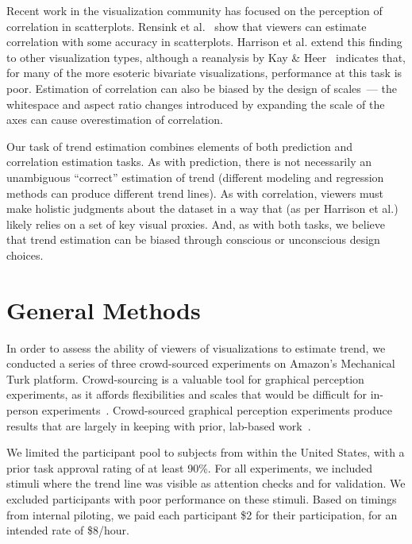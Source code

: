 \documentclass[chi_draft]{sigchi}
\begin{document}
Recent work in the visualization community has focused on the perception of correlation in scatterplots. Rensink et al.~\cite{rensink2010perception} show that viewers can estimate correlation with some accuracy in scatterplots. Harrison et al. \cite{harrison2014ranking} extend this finding to other visualization types, although a reanalysis by Kay \& Heer~\cite{kay2016beyond} indicates that, for many of the more esoteric bivariate visualizations, performance at this task is poor. Estimation of correlation can also be biased by the design of scales~\cite{cleveland1982variables}--- the whitespace and aspect ratio changes introduced by expanding the scale of the axes can cause overestimation of correlation.

Our task of trend estimation combines elements of both prediction and correlation estimation tasks. As with prediction, there is not necessarily an unambiguous ``correct'' estimation of trend (different modeling and regression methods can produce different trend lines). As with correlation, viewers must make holistic judgments about the dataset in a way that (as per Harrison et al.) likely relies on a set of key visual proxies. And, as with both tasks, we believe that trend estimation can be biased through conscious or unconscious design choices.  

\section{General Methods}

In order to assess the ability of viewers of visualizations to estimate trend, we conducted a series of three crowd-sourced experiments on Amazon's Mechanical Turk platform. Crowd-sourcing is a valuable tool for graphical perception experiments, as it affords flexibilities and scales that would be difficult for in-person experiments~\cite{heer2010crowdsourcing}. Crowd-sourced graphical perception experiments produce results that are largely in keeping with prior, lab-based work~\cite{talbot2014four}.


We limited the participant pool to subjects from within the United States, with a prior task approval rating of at least 90\%. For all experiments, we included stimuli where the trend line was visible as attention checks and for validation. We excluded participants with poor performance on these stimuli. Based on timings from internal piloting, we paid each participant \$2 for their participation, for an intended rate of \$8/hour. 
\end{document}

